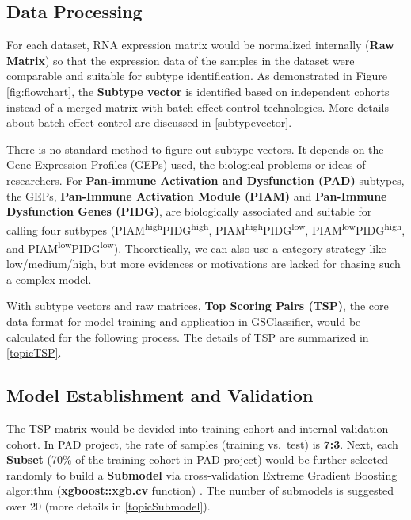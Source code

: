 \documentclass[
  12pt,
]{book}
\begin{document}
\hypertarget{data-processing}{%
\subsection{Data Processing}\label{data-processing}}

For each dataset, RNA expression matrix would be normalized internally (\textbf{Raw Matrix}) so that the expression data of the samples in the dataset were comparable and suitable for subtype identification. As demonstrated in Figure \ref{fig:flowchart}, the \textbf{Subtype vector} is identified based on independent cohorts instead of a merged matrix with batch effect control technologies. More details about batch effect control are discussed in \ref{subtypevector}.

There is no standard method to figure out subtype vectors. It depends on the Gene Expression Profiles (GEPs) used, the biological problems or ideas of researchers. For \textbf{Pan-immune Activation and Dysfunction (PAD)} subtypes, the GEPs, \textbf{Pan-Immune Activation Module (PIAM)} and \textbf{Pan-Immune Dysfunction Genes (PIDG)}, are biologically associated and suitable for calling four sutbypes (PIAM\textsuperscript{high}PIDG\textsuperscript{high}, PIAM\textsuperscript{high}PIDG\textsuperscript{low}, PIAM\textsuperscript{low}PIDG\textsuperscript{high}, and PIAM\textsuperscript{low}PIDG\textsuperscript{low}). Theoretically, we can also use a category strategy like low/medium/high, but more evidences or motivations are lacked for chasing such a complex model.

With subtype vectors and raw matrices, \textbf{Top Scoring Pairs (TSP)}, the core data format for model training and application in GSClassifier, would be calculated for the following process. The details of TSP are summarized in \ref{topicTSP}.

\hypertarget{model-establishment-and-validation}{%
\subsection{Model Establishment and Validation}\label{model-establishment-and-validation}}

The TSP matrix would be devided into training cohort and internal validation cohort. In PAD project, the rate of samples (training vs.~test) is \textbf{7:3}. Next, each \textbf{Subset} (70\% of the training cohort in PAD project) would be further selected randomly to build a \textbf{Submodel} via cross-validation Extreme Gradient Boosting algorithm (\textbf{xgboost::xgb.cv} function) \citep{RN345}. The number of submodels is suggested over 20 (more details in \ref{topicSubmodel}).
\end{document}
